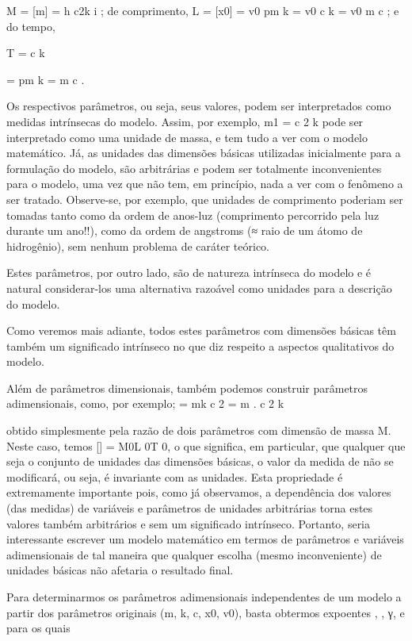 M = [m] = h
c2k
i
; de comprimento, L = [x0] = 
v0
pm
k
=
v0
c
k
=
v0
m
c
; e do tempo,

T =
c
k

=
pm
k
=
m
c
.

Os respectivos parâmetros, ou seja, seus valores, podem ser interpretados como medidas intrínsecas do modelo. Assim, por exemplo, m1 =
c
2
k
pode ser interpretado como uma unidade de massa, e tem tudo a ver com o modelo matemático. Já, as unidades das dimensões básicas utilizadas inicialmente para a formulação do modelo, são arbitrárias e podem ser totalmente inconvenientes para o modelo, uma vez que não tem, em princípio, nada a ver com o fenômeno a ser tratado. Observe-se, por exemplo, que unidades de
comprimento poderiam ser tomadas tanto como da ordem de anos-luz (comprimento percorrido pela luz durante um ano!!), como da ordem de angstroms (≈ raio de um átomo de hidrogênio), sem nenhum problema de caráter teórico.
 
Estes parâmetros, por outro lado, são de natureza intrínseca do modelo e é natural considerar-los uma alternativa razoável como unidades para a descrição do modelo.

Como veremos mais adiante, todos estes parâmetros com dimensões básicas têm também um significado intrínseco no que diz respeito a aspectos qualitativos do modelo.

Além de parâmetros dimensionais, também podemos construir parâmetros adimensionais, como, por exemplo;  =
mk
c
2 = m
. c
2
k

obtido simplesmente pela razão de dois parâmetros com dimensão de massa M. Neste caso, temos [] = M0L
0T
0,
o que significa, em particular, que qualquer que seja o conjunto de unidades das dimensões básicas, o valor da medida de  não se modificará, ou seja,  é invariante com as unidades. Esta propriedade é extremamente importante pois, como já observamos, a dependência dos valores (das medidas) de variáveis e parâmetros de unidades arbitrárias torna estes valores também arbitrários e sem um significado intrínseco. Portanto, seria interessante escrever um modelo matemático em termos de parâmetros e variáveis adimensionais de tal maneira que qualquer escolha (mesmo inconveniente) de unidades básicas não afetaria o resultado final.

Para determinarmos os parâmetros adimensionais independentes de um modelo a partir dos parâmetros originais (m, k, c, x0, v0), basta obtermos expoentes \alpha, \beta, γ, \delta e \lambda para os quais


